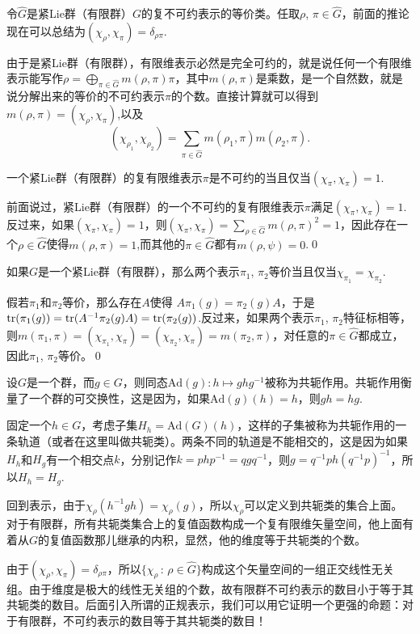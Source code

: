 \documentclass[9pt]{extarticle}
\begin{document}
令$\hat{G}$是紧Lie群（有限群）$G$的复不可约表示的等价类。任取$\rho$, $\pi\in\hat{G}$，前面的推论现在可以总结为$(\chi_\rho,\chi_\pi)=\delta_{\rho\pi}$.

由于是紧Lie群（有限群），有限维表示必然是完全可约的，就是说任何一个有限维表示能写作$\rho=\bigoplus_{\pi\in\hat{G}}m(\rho,\pi)\pi$，其中$m(\rho,\pi)$是乘数，是一个自然数，就是说分解出来的等价的不可约表示$\pi$的个数。直接计算就可以得到$m(\rho,\pi)=(\chi_\rho,\chi_\pi)$,以及
\begin{equation}
	(\chi_{\rho_1},\chi_{\rho_2})=\sum_{\pi\in\hat{G}}m(\rho_1,\pi)m(\rho_2,\pi).
\end{equation}

\pro 一个紧Lie群（有限群）的复有限维表示$\pi$是不可约的当且仅当$(\chi_{\pi},\chi_{\pi})=1$. 

\proof 前面说过，紧Lie群（有限群）的一个不可约的复有限维表示$\pi$满足$(\chi_\pi, \chi_\pi)=1$. 反过来，如果$(\chi_\pi, \chi_\pi)=1$，则$(\chi_{\pi},\chi_{\pi})=\sum_{\rho\in\hat{G}}m(\rho,\pi)^2=1$，因此存在一个$\rho\in\hat{G}$使得$m(\rho,\pi)=1$,而其他的$\pi\in\hat{G}$都有$m(\rho,\psi)=0$.\qed

\pro 如果$G$是一个紧Lie群（有限群），那么两个表示$\pi_1$, $\pi_2$等价当且仅当$\chi_{\pi_1}=\chi_{\pi_2}$.

\proof 假若$\pi_1$和$\pi_2$等价，那么存在$A$使得
$A\pi_1(g)=\pi_2(g)A$，于是$\operatorname{tr}(\pi_1(g))=\operatorname{tr}(A^{-1}\pi_2(g)A)=\operatorname{tr}(\pi_2(g))$.反过来，如果两个表示$\pi_1$, $\pi_2$特征标相等，则$	m(\pi_1,\pi)=(\chi_{\pi_1},\chi_\pi)=(\chi_{\pi_2},\chi_\pi)=m(\pi_2,\pi)$，对任意的$\pi\in\hat{G}$都成立，因此$\pi_1$, $\pi_2$等价。\qed

\para 设$G$是一个群，而$g\in G$，则同态$\mathrm{Ad}(g):h\mapsto ghg^{-1}$被称为共轭作用。共轭作用衡量了一个群的可交换性，这是因为，如果$\mathrm{Ad}(g)(h)=h$，则$gh=hg$.

固定一个$h\in G$，考虑子集$H_h=\mathrm{Ad}(G)(h)$，这样的子集被称为共轭作用的一条轨道（或者在这里叫做共轭类）。两条不同的轨道是不能相交的，这是因为如果$H_h$和$H_g$有一个相交点$k$，分别记作$k=php^{-1}=qgq^{-1}$，则$g=q^{-1}ph(q^{-1}p)^{-1}$，所以$H_h=H_g$.

\para 回到表示，由于$\chi_\rho(h^{-1}gh)= \chi_\rho(g)$，所以$\chi_\rho$可以定义到共轭类的集合上面。对于有限群，所有共轭类集合上的复值函数构成一个复有限维矢量空间，他上面有着从$G$的复值函数那儿继承的内积，显然，他的维度等于共轭类的个数。

由于$(\chi_\rho,\chi_\pi)=\delta_{\rho\pi}$，所以$\{\chi_\rho\,:\, \rho\in \hat{G}\}$构成这个矢量空间的一组正交线性无关组。由于维度是极大的线性无关组的个数，故有限群不可约表示的数目小于等于其共轭类的数目。后面引入所谓的正规表示，我们可以用它证明一个更强的命题：对于有限群，不可约表示的数目等于其共轭类的数目！
\end{document}
